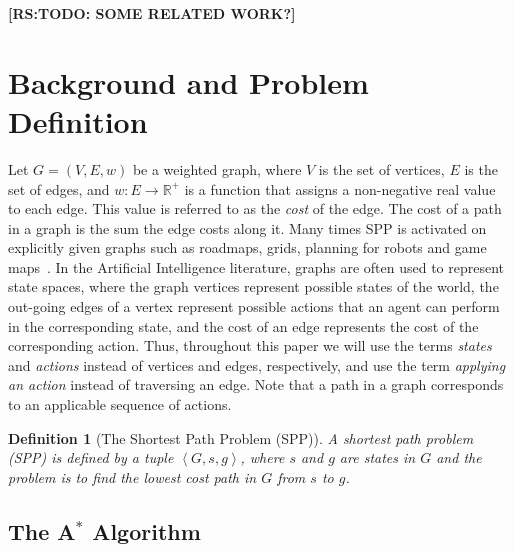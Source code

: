\documentclass{aicom2e}
\newtheorem{definition}{Definition}
\newcommand{\astar}{A$^*$}
\newcommand{\tuple}[1]{\ensuremath{\left \langle #1 \right \rangle }}
\newcommand{\roni}[1]{\textbf{[RS:#1]}}
\begin{document}
\roni{TODO: SOME RELATED WORK?}

\section{Background and Problem Definition}



Let $G=(V,E,w)$ be a weighted graph, where $V$ is the set of vertices, $E$ is
the set of edges, and $w:E\rightarrow \mathbb{R}^+$ is a function that assigns
a non-negative real value to each edge. This value is referred to as the {\em
cost} of the edge. The cost of a path in a graph is the sum the edge costs
along it. Many times SPP is activated on explicitly given graphs such as
roadmaps, grids, planning for robots and game
maps~\cite{Ststurtevant2012benchmarks}. In the Artificial Intelligence
literature, graphs are often used to represent state spaces, where the graph
vertices represent possible states of the world, the out-going edges of a
vertex represent possible actions that an agent can perform in the
corresponding state, and the cost of an edge represents the cost of the
corresponding action. Thus, throughout this paper we will use the terms {\em
states} and {\em actions} instead of vertices and edges, respectively, and use
the term {\em applying an action} instead of traversing an edge. Note that a
path in a graph corresponds to an applicable sequence of actions.

\begin{definition}[The Shortest Path Problem (SPP)]
A shortest path problem (SPP) is defined by a tuple $\tuple{G,s,g}$, where $s$
and $g$ are states in $G$ and the problem is to find the lowest cost path in
$G$ from $s$ to $g$. \label{def:spp}
\end{definition}

\subsection{The \astar{} Algorithm}
\end{document}
